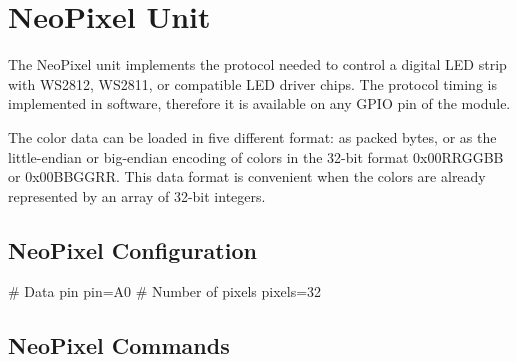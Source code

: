 \section{NeoPixel Unit}

The NeoPixel unit implements the protocol needed to control a digital LED strip with WS2812, WS2811, or compatible LED driver chips. The protocol timing is implemented in software, therefore it is available on any GPIO pin of the module.

The color data can be loaded in five different format: as packed bytes, or as the little-endian or big-endian encoding of colors in the 32-bit format 0x00RRGGBB or 0x00BBGGRR. This data format is convenient when the colors are already represented by an array of 32-bit integers.

\subsection{NeoPixel Configuration}

\begin{inicode}
# Data pin
pin=A0
# Number of pixels
pixels=32
\end{inicode}

\subsection{NeoPixel Commands}

